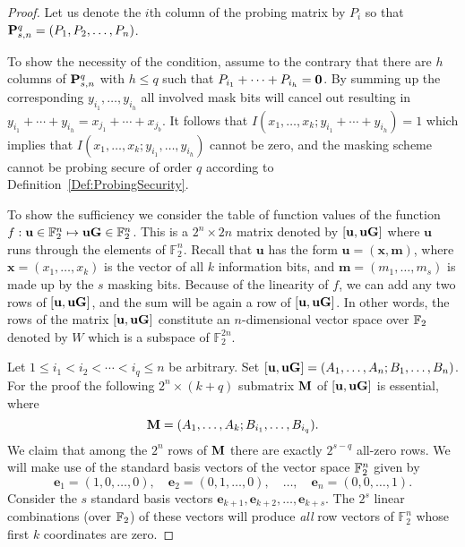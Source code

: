 \documentclass[11pt]{llncs}
\begin{document}
\begin{proof}
Let us denote the $i$th column of the probing matrix
by $P_i$ so that $\mathbf{P}_{s,n}^q =(P_1,P_2,\dotsc,P_n)$.

To show the necessity of the condition,
assume to the contrary that there are $h$ columns of
$\mathbf{P}_{s,n}^q$ with $h \leq q$ such that $P_{i_1}+\dotsb +P_{i_h} = \mathbf{0}$.
By summing up the corresponding
$y_{i_1},\dotsc,y_{i_h}$
all involved mask bits  will cancel out resulting in
$y_{i_1}+ \dotsb +y_{i_h} = x_{j_1}+\dotsb +x_{j_b}$.
It follows that $I(x_1,\dotsc,x_k; y_{i_1}+\dotsb +y_{i_h})=1$
which implies that $I(x_1,\dotsc,x_k;y_{i_1},\dotsc,y_{i_h})$
cannot be zero, and the masking scheme cannot be
probing secure of order $q$ according to Definition~\ref{Def:ProbingSecurity}.

To show the sufficiency we consider the table of function
values of the function $f:\mathbf{u} \in
\mathbb{F}_2^n \mapsto \mathbf{u} \mathbf{G} \in \mathbb{F}_2^n$.
This is a $2^n \times 2n$ matrix denoted by
$[\mathbf{u}, \mathbf{u} \mathbf{G}]$ where $\mathbf{u}$
runs through the elements of $\mathbb{F}_2^n$.
Recall that $\mathbf{u}$ has the form $\mathbf{u} = (\mathbf{x},\mathbf{m})$,
where
$\mathbf{x}=(x_1,\dotsc,x_k)$ is the vector of all $k$ information bits, and
$\mathbf{m}=(m_1,\dotsc,m_s)$ is made up by the $s$ masking bits.
Because of the linearity of $f$,
we can add any two rows of $[\mathbf{u}, \mathbf{u} \mathbf{G}]$,
and the sum will be again a row of $[\mathbf{u}, \mathbf{u} \mathbf{G}]$.
In other words, the rows of the matrix $[\mathbf{u}, \mathbf{u} \mathbf{G}]$
constitute an $n$-dimensional vector space over $\mathbb{F}_2$
denoted by $W$ which is a subspace
of $\mathbb{F}_2^{2n}$.

Let $1 \leq i_1 < i_2 < \dotsb < i_q \leq n$ be arbitrary.
Set $[\mathbf{u}, \mathbf{u} \mathbf{G}] = (A_1,\dotsc,A_n;B_1,\dotsc,B_n)$.
For the proof the following $2^n \times (k+q)$ submatrix $\mathbf{M}$ of
$[\mathbf{u}, \mathbf{u} \mathbf{G}]$ is essential, where
\begin{equation} \label{Eq:SubmatrixM}
\mathbf{M} = (A_1,\dotsc,A_k; B_{i_1},\dotsc,B_{i_q}).
\end{equation}
We claim that among the $2^n$ rows of $\mathbf{M}$ there are exactly $2^{s-q}$ all-zero rows.
We will make use of the standard basis vectors of the vector space $\mathbb{F}_2^n$ given by
\[
\mathbf{e}_1 = (1,0,\dotsc,0), \quad \mathbf{e}_2 = (0,1,\dotsc,0),  \quad  \dotsc, \quad
\mathbf{e}_n = (0,0,\dotsc,1).
\]
Consider the $s$ standard basis vectors $\mathbf{e}_{k+1}, \mathbf{e}_{k+2}, \dotsc,
\mathbf{e}_{k+s}$. The $2^s$ linear combinations (over $\mathbb{F}_2$) of these vectors will
produce \emph{all} row vectors of $\mathbb{F}_2^n$ whose first $k$ coordinates are zero.


\end{proof}
\end{document}

